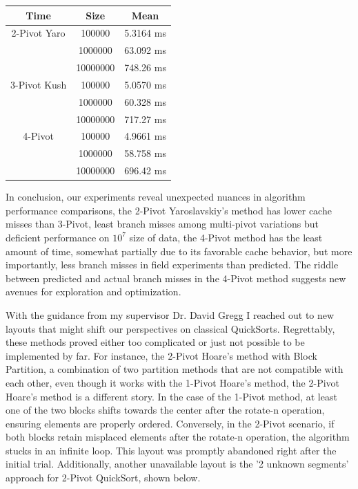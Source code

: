 \documentclass{article}
\begin{document}
\begin{center}
\small
\begin{tabular}{ |c c | c | }
    \hline
    Time            & Size     & Mean         \\
    \hline
    2-Pivot Yaro    & 100000   & 5.3164 ms    \\
                    & 1000000  & 63.092 ms    \\
                    & 10000000 & 748.26 ms    \\

    \hline
    3-Pivot Kush    & 100000   & 5.0570 ms    \\
                    & 1000000  & 60.328 ms    \\
                    & 10000000 & 717.27 ms    \\
    \hline
    4-Pivot         & 100000   & 4.9661 ms    \\
                    & 1000000  & 58.758 ms    \\
                    & 10000000 & 696.42 ms    \\
    \hline
\end{tabular}
\end{center}

In conclusion, our experiments reveal unexpected nuances in algorithm performance comparisons, the 2-Pivot Yaroslavskiy's method has lower cache misses than 3-Pivot, least branch misses among multi-pivot variations but deficient performance on $10^7$ size of data, the 4-Pivot method has the least amount of time,
somewhat partially due to its favorable cache behavior, but more importantly, less branch misses in field experiments than predicted. The riddle between predicted and actual branch misses in the 4-Pivot method suggests new avenues for exploration and optimization.


With the guidance from my supervisor Dr. David Gregg I reached out to new layouts that might shift our perspectives on classical QuickSorts. Regrettably, these methods proved either too complicated or just not possible to be implemented by far.
For instance, the 2-Pivot Hoare's method with Block Partition, a combination of two partition methods that are not compatible with each other, even though it works with the 1-Pivot Hoare's method, the 2-Pivot Hoare's method is a different story.
In the case of the 1-Pivot method, at least one of the two blocks shifts towards the center after the rotate-n operation, ensuring elements are properly ordered. Conversely, in the 2-Pivot scenario, if both blocks retain misplaced elements after the rotate-n operation, the algorithm stucks in an infinite loop.
This layout was promptly abandoned right after the initial trial. Additionally, another unavailable layout is the '2 unknown segments' approach for 2-Pivot QuickSort, shown below.
\end{document}
